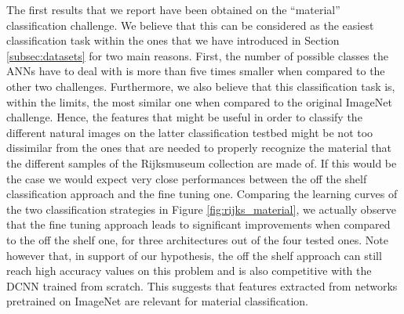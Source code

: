 \documentclass[runningheads]{llncs}
\begin{document}
The first results that we report have been obtained on the ``material'' classification challenge. We believe that this can be considered as the easiest classification task within the ones that we have introduced in Section \ref{subsec:datasets} for two main reasons. First, the number of possible classes the ANNs have to deal with is more than five times smaller when compared to the other two challenges. Furthermore, we also believe that this classification task is, within the limits, the most similar one when compared to the original ImageNet challenge. Hence, the features that might be useful in order to classify the different natural images on the latter classification testbed might be not too dissimilar from the ones that are needed to properly recognize the material that the different samples of the Rijksmuseum collection are made of. If this would be the case we would expect very close performances between the off the shelf classification approach and the fine tuning one.
Comparing the learning curves of the two classification strategies in Figure \ref{fig:rijks_material}, we actually observe that the fine tuning approach leads to significant improvements when compared to the off the shelf one, for three architectures out of the four tested ones. Note however that, in support of our hypothesis, the off the shelf approach can still reach high accuracy values on this problem and is also competitive with the DCNN trained from scratch. This suggests that features extracted from networks pretrained on ImageNet are relevant for material classification.

\end{document}
